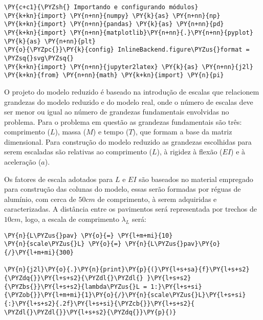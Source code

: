 
    
    

    
    \begin{tcolorbox}[breakable, size=fbox, boxrule=1pt, pad at break*=1mm,colback=cellbackground, colframe=cellborder]
\begin{Verbatim}[commandchars=\\\{\}]
\PY{c+c1}{\PYZsh{} Importando e configurando módulos}
\PY{k+kn}{import} \PY{n+nn}{numpy} \PY{k}{as} \PY{n+nn}{np}
\PY{k+kn}{import} \PY{n+nn}{pandas} \PY{k}{as} \PY{n+nn}{pd} 
\PY{k+kn}{import} \PY{n+nn}{matplotlib}\PY{n+nn}{.}\PY{n+nn}{pyplot} \PY{k}{as} \PY{n+nn}{plt}
\PY{o}{\PYZpc{}}\PY{k}{config} InlineBackend.figure\PYZus{}format = \PYZsq{}svg\PYZsq{}
\PY{k+kn}{import} \PY{n+nn}{jupyter2latex} \PY{k}{as} \PY{n+nn}{j2l}
\PY{k+kn}{from} \PY{n+nn}{math} \PY{k+kn}{import} \PY{n}{pi}
\end{Verbatim}
\end{tcolorbox}



O projeto do modelo reduzido é baseado na introdução de escalas que
relacionem grandezas do modelo reduzido e do modelo real, onde o número
de escalas deve ser menor ou igual ao número de grandezas fundamentais
envolvidas no problema. Para o problema em questão as grandezas
fundamentais são três: comprimento (\(L\)), massa (\(M\)) e tempo
(\(T\)), que formam a base da matriz dimensional. Para construção do
modelo reduzido as grandezas escolhidas para serem escaladas são
relativas ao comprimento (\(L\)), à rigidez à flexão (\(EI\)) e à
aceleração (\(a\)).

    Os fatores de escala adotados para \(L\) e \(EI\) são baseados no
material empregado para construção das colunas do modelo, essas serão
formadas por réguas de alumínio, com cerca de \(50 cm\) de comprimento,
à serem adquiridas e caracterizadas. A distância entre os pavimentos
será representada por trechos de \(10 cm\), logo, a escala de
comprimento \(\lambda_L\) será:

    \begin{tcolorbox}[breakable, size=fbox, boxrule=1pt, pad at break*=1mm,colback=cellbackground, colframe=cellborder]
\begin{Verbatim}[commandchars=\\\{\}]
\PY{n}{L\PYZus{}pav} \PY{o}{=} \PY{l+m+mi}{10}
\PY{n}{scale\PYZus{}L} \PY{o}{=} \PY{n}{L\PYZus{}pav}\PY{o}{/}\PY{l+m+mi}{300}

\PY{n}{j2l}\PY{o}{.}\PY{n}{print}\PY{p}{(}\PY{l+s+sa}{f}\PY{l+s+s2}{\PYZdq{}}\PY{l+s+s2}{\PYZdl{}\PYZdl{} }\PY{l+s+s2}{\PYZbs{}}\PY{l+s+s2}{lambda\PYZus{}L = 1:}\PY{l+s+si}{\PYZob{}}\PY{l+m+mi}{1}\PY{o}{/}\PY{n}{scale\PYZus{}L}\PY{l+s+si}{:}\PY{l+s+s2}{.2f}\PY{l+s+si}{\PYZcb{}}\PY{l+s+s2}{ \PYZdl{}\PYZdl{}}\PY{l+s+s2}{\PYZdq{}}\PY{p}{)}
\end{Verbatim}
\end{tcolorbox}

